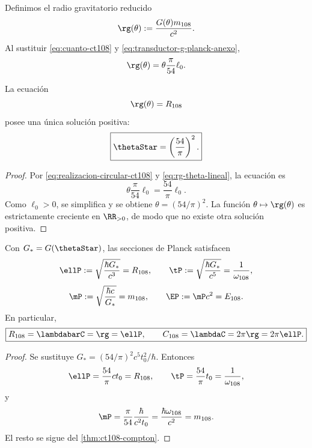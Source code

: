 Definimos el radio gravitatorio reducido
\begin{equation}
\rg(\theta):=\frac{G(\theta)m_{108}}{c^2}.
\label{eq:radio-gravitatorio-reducido}
\end{equation}
Al sustituir \eqref{eq:cuanto-ct108} y
\eqref{eq:transductor-g-planck-anexo},
\begin{equation}
\rg(\theta)
=\theta\frac{\pi}{54}\ell_0.
\label{eq:rg-theta-lineal}
\end{equation}

\begin{theorem}
\label{thm:selector-autodual-ct108}
La ecuación
\[
\rg(\theta)=R_{108}
\]
posee una única solución positiva:
\begin{equation}
\boxed{\thetaStar=\left(\frac{54}{\pi}\right)^2.}
\label{eq:theta-star}
\end{equation}
\end{theorem}

\begin{proof}
Por \eqref{eq:realizacion-circular-ct108} y
\eqref{eq:rg-theta-lineal}, la ecuación es
\[
\theta\frac{\pi}{54}\ell_0
=\frac{54}{\pi}\ell_0.
\]
Como \(\ell_0>0\), se simplifica y se obtiene
\(\theta=(54/\pi)^2\). La función
\(\theta\mapsto\rg(\theta)\) es estrictamente creciente en
\(\RR_{>0}\), de modo que no existe otra solución positiva.
\end{proof}

\begin{corollary}
\label{cor:unidad-planck-interna}
Con \(G_*=G(\thetaStar)\), las secciones de Planck satisfacen
\begin{equation}
\ellP:=\sqrt{\frac{\hbar G_*}{c^3}}=R_{108},
\qquad
\tP:=\sqrt{\frac{\hbar G_*}{c^5}}=\frac1{\omega_{108}},
\label{eq:planck-long-time-ct108}
\end{equation}
\begin{equation}
\mP:=\sqrt{\frac{\hbar c}{G_*}}=m_{108},
\qquad
\EP:=\mP c^2=E_{108}.
\label{eq:planck-mass-energy-ct108}
\end{equation}
En particular,
\begin{equation}
\boxed{
R_{108}=\lambdabarC=\rg=\ellP,
\qquad
C_{108}=\lambdaC=2\pi\rg=2\pi\ellP.}
\label{eq:tres-lectores-planck}
\end{equation}
\end{corollary}

\begin{proof}
Se sustituye \(G_*=(54/\pi)^2c^5t_0^2/\hbar\). Entonces
\[
\ellP=\frac{54}{\pi}ct_0=R_{108},
\qquad
\tP=\frac{54}{\pi}t_0=\frac1{\omega_{108}},
\]
y
\[
\mP=\frac{\pi}{54}\frac{\hbar}{c^2t_0}
=\frac{\hbar\omega_{108}}{c^2}=m_{108}.
\]
El resto se sigue del \cref{thm:ct108-compton}.
\end{proof}

